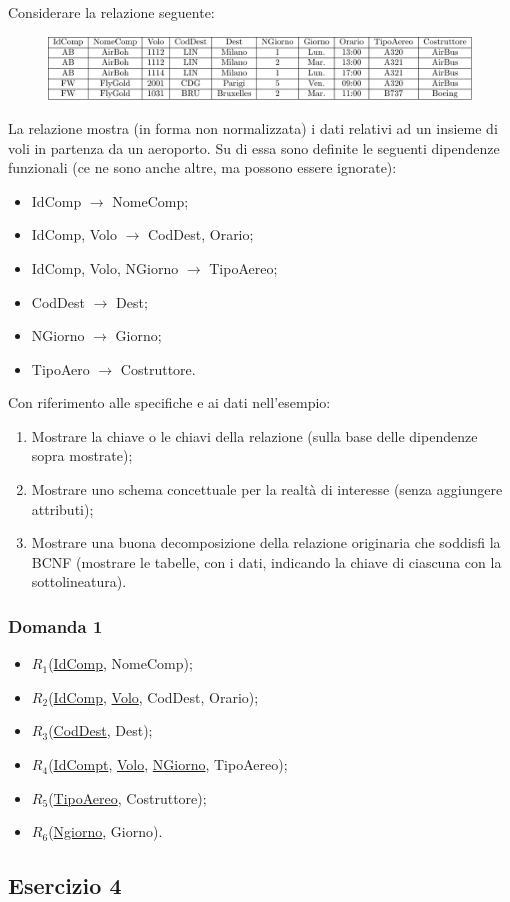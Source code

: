 \documentclass{article}
\numberwithin{equation}{subsection}
\begin{document}
Considerare la relazione seguente:
\begin{figure}[H]%
    \centering%
    \includegraphics[scale=0.8]{relazione_13-12-24.pdf}%
\end{figure}

La relazione mostra (in forma non normalizzata) i dati relativi ad un insieme di voli in partenza da un aeroporto.
Su di essa sono definite le seguenti dipendenze funzionali (ce ne sono anche altre, ma possono essere ignorate):
\begin{itemize}
    \item IdComp $\to$ NomeComp;
    \item IdComp, Volo $\to$ CodDest, Orario;
    \item IdComp, Volo, NGiorno $\to$ TipoAereo;
    \item CodDest $\to$ Dest;
    \item NGiorno $\to$ Giorno;
    \item TipoAero $\to$ Costruttore. 
\end{itemize}

Con riferimento alle specifiche e ai dati nell'esempio:
\begin{enumerate}
    \item Mostrare la chiave o le chiavi della relazione (sulla base delle dipendenze sopra mostrate);
    \item Mostrare uno schema concettuale per la realtà di interesse (senza aggiungere attributi);
    \item Mostrare una buona decomposizione della relazione originaria che soddisfi la BCNF (mostrare le tabelle,
con i dati, indicando la chiave di ciascuna con la sottolineatura).
\end{enumerate}

\subsubsection*{Domanda 1}

\begin{itemize}
    \item $R_1$(\underline{IdComp}, NomeComp);
    \item $R_2$(\underline{IdComp}, \underline{Volo}, CodDest, Orario);
    \item $R_3$(\underline{CodDest}, Dest);
    \item $R_4$(\underline{IdCompt}, \underline{Volo}, \underline{NGiorno}, TipoAereo);
    \item $R_5$(\underline{TipoAereo}, Costruttore);
    \item $R_6$(\underline{Ngiorno}, Giorno). 
\end{itemize}

\subsection{Esercizio 4}

\end{document}
